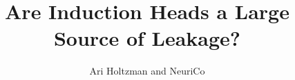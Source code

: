 \documentclass{article}
\title{Are Induction Heads a Large Source of Leakage?}
\author{Ari Holtzman and NeuriCo}
\begin{document}
\maketitle

\begin{abstract}

\end{abstract}









\end{document}
